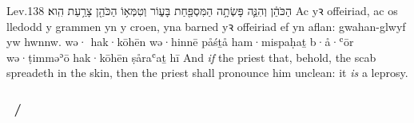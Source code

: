\begin{example}{Lev.}{13}{8}{}{}
	\quoling
	{ הַכֹּהֵ֔ן וְהִנֵּ֛ה פָּשְׂתָ֥ה הַמִּסְפַּ֖חַת בָּע֑וֹר וְטִמְּא֥וֹ הַכֹּהֵ֖ן צָרַ֥עַת הִֽוא׃}
	{Ac  yꝛ offeiriad, ac os lledodd y grammen yn y croen, yna barned yꝛ offeiriad ef yn aflan: gwahan-glwyf yw hwnnw.}
	{wə· hak·kōhēn wə·hinnē påśṯå ham·mispaḥaṯ b·å·ʿōr wə·ṭimməʾō hak·kōhēn ṣåraʿaṯ hī}
	{And \emph{if} the priest  that, behold, the scab spreadeth in the skin, then the priest shall pronounce him unclean: it \emph{is} a leprosy.}
\end{example}





\subsubsection{}



\subsubsection{~/ }



\subsubsection{}



\subsubsection{}



\subsubsection{}




\subsubsection{}

